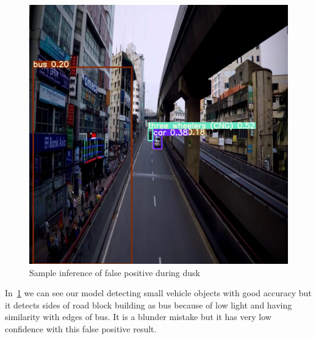 \begin{figure}[ht]
    \centering
    \includegraphics[max width=\textwidth]{images/ours/3 (3).jpg}
   \caption[Sample Inference of Vehicles 7]{Sample inference of false positive during dusk}
    \label{fig:inference346}
\end{figure}

In~\ref{fig:inference346} we can see our model detecting small vehicle objects with good accuracy but it detects sides of road block building as bus because of low light and having similarity with edges of bus. It is a blunder mistake but it has very low confidence with this false positive result.
\newpage


